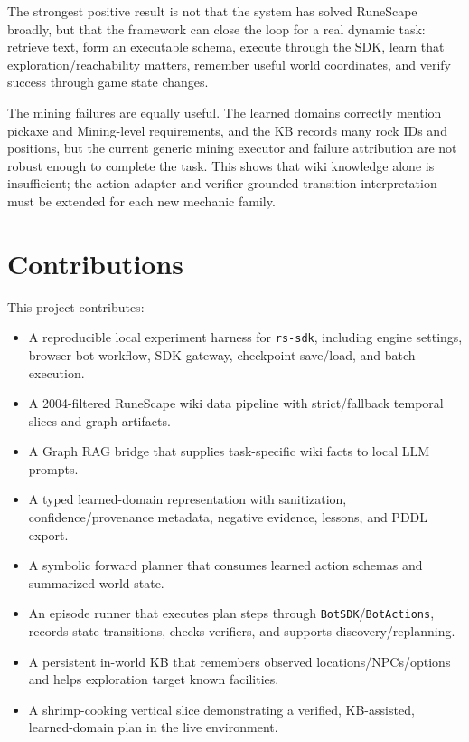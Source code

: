 \documentclass[10pt,twocolumn,letterpaper]{article}
\begin{document}
The strongest positive result is not that the system has solved RuneScape broadly, but that the framework can close the loop for a real dynamic task: retrieve text, form an executable schema, execute through the SDK, learn that exploration/reachability matters, remember useful world coordinates, and verify success through game state changes.

The mining failures are equally useful. The learned domains correctly mention pickaxe and Mining-level requirements, and the KB records many rock IDs and positions, but the current generic mining executor and failure attribution are not robust enough to complete the task. This shows that wiki knowledge alone is insufficient; the action adapter and verifier-grounded transition interpretation must be extended for each new mechanic family.

\section{Contributions}

This project contributes:

\begin{itemize}
    \item A reproducible local experiment harness for \texttt{rs-sdk}, including engine settings, browser bot workflow, SDK gateway, checkpoint save/load, and batch execution.
    \item A 2004-filtered RuneScape wiki data pipeline with strict/fallback temporal slices and graph artifacts.
    \item A Graph RAG bridge that supplies task-specific wiki facts to local LLM prompts.
    \item A typed learned-domain representation with sanitization, confidence/provenance metadata, negative evidence, lessons, and PDDL export.
    \item A symbolic forward planner that consumes learned action schemas and summarized world state.
    \item An episode runner that executes plan steps through \texttt{BotSDK}/\texttt{BotActions}, records state transitions, checks verifiers, and supports discovery/replanning.
    \item A persistent in-world KB that remembers observed locations/NPCs/options and helps exploration target known facilities.
    \item A shrimp-cooking vertical slice demonstrating a verified, KB-assisted, learned-domain plan in the live environment.
\end{itemize}
\end{document}
